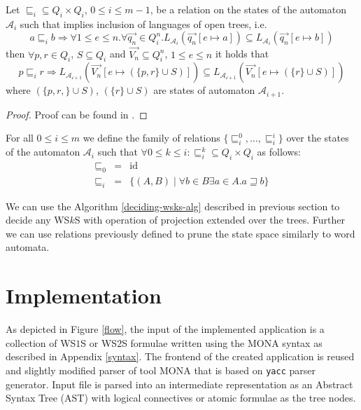 \begin{lemma}
Let $\sqsubseteq_i \subseteq Q_i \times Q_i$, $0 \leq i \leq m-1$, be a relation
on the states of the automaton $\mathcal{A}_i$ such that implies inclusion of
languages of open trees, i.e.
\begin{equation}
 a \sqsubseteq_i b \Rightarrow \forall 1 \leq e \leq n. \forall
 \overset{\rightarrow}{q_n} \in Q_i^n.
 L_{\mathcal{A}_i}(\overset{\rightarrow}{q_n}[e \mapsto a]) \subseteq
 L_{\mathcal{A}_i}(\overset{\rightarrow}{q_n}[e \mapsto b])
\end{equation}
then $\forall p, r \in Q_i$, $S \subseteq Q_i$ and $\overset{\rightarrow}{V_n}
\subseteq Q^n_i$, $1 \leq e \leq n$ it holds that
\begin{equation}
 p \sqsubseteq_i r \Rightarrow
 L_{\mathcal{A_{i+1}}}(\overset{\rightarrow}{V_n}[e \mapsto (\{p, r\} \cup S)])
 \subseteq  L_{\mathcal{A_{i+1}}}(\overset{\rightarrow}{V_n}[e \mapsto (\{r\}
 \cup S)])
\end{equation}
where $(\{p, r,\} \cup S)$, $(\{r\} \cup S)$ are states of automaton
$\mathcal{A}_{i+1}$.
\end{lemma}

\begin{proof}
Proof can be found in \cite{tacas}.
\end{proof}

\begin{defz}
For all $0 \leq i \leq m$ we define the family of relations
$\{\sqsubseteq_i^0,\ldots,\sqsubseteq^i_i\}$ over the states of the automaton
$\mathcal{A}_i$ such that $\forall 0 \leq k \leq i: \sqsubseteq_i^k\subseteq Q_i
\times Q_i$ as follows:
\begin{eqnarray}
 \sqsubseteq_0 & = & \text{id}\\
 \sqsubseteq_i & = & \{(A, B) \mid \forall b \in B \exists a \in A. a
 \sqsupseteq b\}
\end{eqnarray}
\end{defz}

We can use the Algorithm \ref{deciding-wsks-alg} described in previous section
to decide any WS$k$S with operation of projection extended over the trees.
Further we can use relations previously defined to prune the state space
similarly to word automata.

\chapter{Implementation}

As depicted in Figure \ref{flow}, the input of the implemented application is
a collection of WS$1$S or WS$2$S formulae written using the \textsc{MONA}
syntax as described in Appendix \ref{syntax}. The frontend of the
created application is reused and slightly modified parser of tool \textsc{MONA}
that is based on \texttt{yacc} \cite{yacc} parser generator. Input file is
parsed into an intermediate representation as an Abstract Syntax
Tree (AST) with logical connectives or atomic formulae as the
tree nodes.

